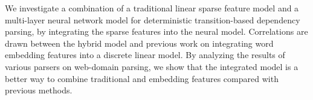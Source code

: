 We investigate a combination of a traditional linear sparse feature model and a multi-layer neural network model for deterministic transition-based dependency parsing, by integrating the sparse features into the neural model. Correlations are drawn between the hybrid model and previous work on integrating word embedding features into a discrete linear model. By analyzing the results of various parsers on web-domain parsing, we show that the integrated model is a better way to combine traditional and embedding features compared with previous methods.
